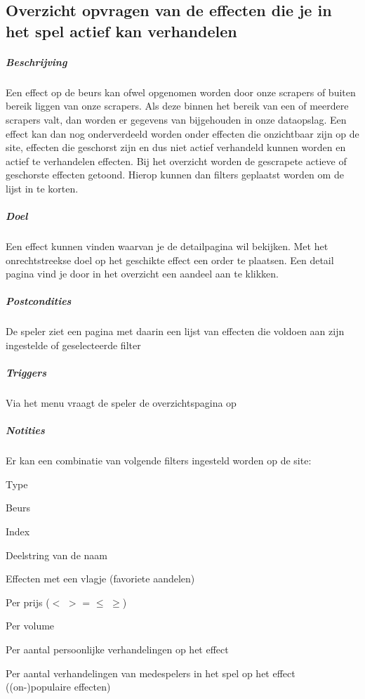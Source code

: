 \subsection{Overzicht opvragen van de effecten die je in het spel actief kan verhandelen}
\begin{compact}
\subparagraph{Beschrijving} Een effect op de beurs kan ofwel opgenomen worden door onze scrapers of buiten bereik liggen van onze scrapers.
Als deze binnen het bereik van een of meerdere scrapers valt, dan worden er gegevens van bijgehouden in onze dataopslag. Een effect kan dan nog onderverdeeld worden onder effecten die onzichtbaar zijn op de site, effecten die geschorst zijn en dus niet actief verhandeld kunnen worden en actief te verhandelen effecten. Bij het overzicht worden de gescrapete actieve of geschorste effecten getoond. Hierop kunnen dan filters geplaatst worden om de lijst in te korten.
\subparagraph{Doel} Een effect kunnen vinden waarvan je de detailpagina wil bekijken. Met het onrechtstreekse doel op het geschikte effect een order te plaatsen. Een detail pagina vind je door in het overzicht een aandeel aan te klikken.
\subparagraph{Postcondities} De speler ziet een pagina met daarin een lijst van effecten die voldoen aan zijn ingestelde of geselecteerde filter
\subparagraph{Triggers} Via het menu vraagt de speler de overzichtspagina op
\subparagraph{Notities} Er kan een combinatie van volgende filters ingesteld worden op de site:

\begin{itemize_compact}
	\item Type
	\item Beurs
	\item Index
	\item Deelstring van de naam
	\item Effecten met een vlagje (favoriete aandelen)
	\item Per prijs ($<$ $>$ = $\leq$ $\geq$)
	\item Per volume
	\item Per aantal persoonlijke verhandelingen op het effect
	\item Per aantal verhandelingen van medespelers in het spel op het effect ((on-)populaire effecten)
\end{itemize_compact}


\end{compact}

